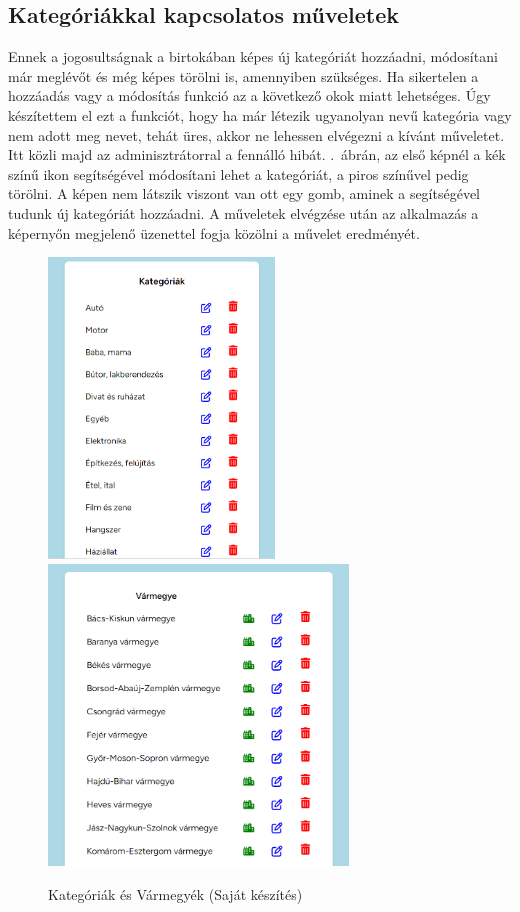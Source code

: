 \documentclass[]{thesis-ekf}
\theoremstyle{definition}
\theoremstyle{remark}
\begin{document}
	\subsection{Kategóriákkal kapcsolatos műveletek}\label{sc-kategoria}
		Ennek a jogosultságnak a birtokában képes új kategóriát hozzáadni, módosítani már meglévőt és még képes törölni is, amennyiben szükséges. Ha sikertelen a hozzáadás vagy a módosítás funkció az a következő okok miatt lehetséges. Úgy készítettem el ezt a funkciót, hogy ha már létezik ugyanolyan nevű kategória vagy nem adott meg nevet, tehát üres, akkor ne lehessen elvégezni a kívánt műveletet. Itt közli majd az adminisztrátorral a fennálló hibát. .~ábrán, az első képnél a kék színű ikon segítségével módosítani lehet a kategóriát, a piros színűvel pedig törölni. A képen nem látszik viszont van ott egy gomb, aminek a segítségével tudunk új kategóriát hozzáadni. A műveletek elvégzése után az alkalmazás a képernyőn megjelenő üzenettel fogja közölni a művelet eredményét.
		\begin{figure}[ht!]
			\centering
			\includegraphics[height=8cm]{./felhasznaloi/kategoria}
			\includegraphics[height=8cm]{./felhasznaloi/varmegye}
			\caption{Kategóriák és Vármegyék (Saját készítés)} 
			\label{kategoria-muveletek}
			\label{varmegye-varos-muvelet}
		\end{figure} 
\end{document}
